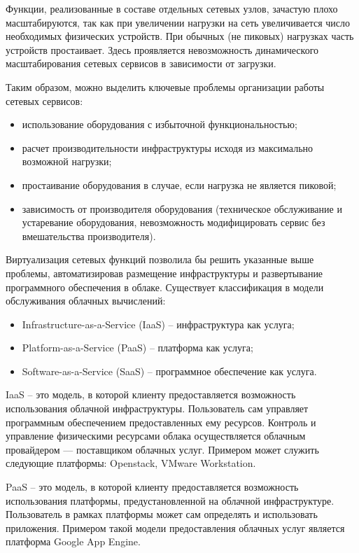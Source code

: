 \documentclass[oneside,final,14pt,a4paper]{extreport}
\begin{document}
Функции, реализованные в составе отдельных сетевых узлов, зачастую плохо масштабируются, так как при увеличении нагрузки на сеть увеличивается число необходимых физических устройств. При обычных (не пиковых) нагрузках часть устройств простаивает. Здесь проявляется невозможность динамического масштабирования сетевых сервисов в зависимости от загрузки.

Таким образом, можно выделить ключевые проблемы организации работы сетевых сервисов:
\begin{itemize}
	\item использование оборудования с избыточной функциональностью;
	\item расчет производительности инфраструктуры исходя из максимально возможной нагрузки;
	\item простаивание оборудования в случае, если нагрузка не является пиковой;
	\item зависимость от производителя оборудования (техническое обслуживание и устаревание оборудования, невозможность модифицировать сервис без вмешательства производителя).
\end{itemize}

Виртуализация сетевых функций позволила бы решить указанные выше проблемы, автоматизировав размещение инфраструктуры и развертывание программного обеспечения в облаке. Существует классификация в модели обслуживания облачных вычислений:
\begin{itemize}
	\item Infrastructure-as-a-Service (IaaS) -- инфраструктура как услуга;
	\item Platform-as-a-Service (PaaS) --  платформа как услуга;
	\item Software-as-a-Service (SaaS) -- программное обеспечение как услуга.
\end{itemize}

IaaS -- это модель, в которой клиенту предоставляется возможность использования облачной инфраструктуры. Пользователь сам управляет программным обеспечением предоставленных ему ресурсов. Контроль и управление физическими ресурсами облака осуществляется облачным провайдером --- поставщиком облачных услуг. Примером может служить следующие платформы: Openstack\cite{bib:openstack}, VMware Workstation\cite{bib:vmware}.

PaaS -- это модель, в которой клиенту предоставляется возможность использования платформы, предустановленной на облачной инфраструктуре. Пользователь в рамках платформы может сам определять и использовать приложения. Примером такой модели предоставления облачных услуг является платформа Google App Engine.\cite{bib:google-app-engine}
\end{document}
